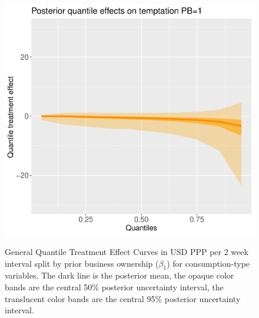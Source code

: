 \documentclass[english,12pt]{article}\usepackage{lmodern}
\numberwithin{equation}{section}
\begin{document}
\begin{figure}[h!]
    \includegraphics[scale=0.4]{posterior_parent_quantile_TEs_temptation_pb_1_lognormal.pdf}\\
  \caption{ General Quantile Treatment Effect Curves in USD PPP per 2 week interval split by prior business ownership ($\beta_1$) for consumption-type variables. The dark line is the posterior mean, the opaque color bands are the central 50\% posterior uncertainty interval, the translucent color bands are the central 95\% posterior uncertainty interval. } \label{consumption posterior general quantiles pb split}
\end{figure}


\end{document}
